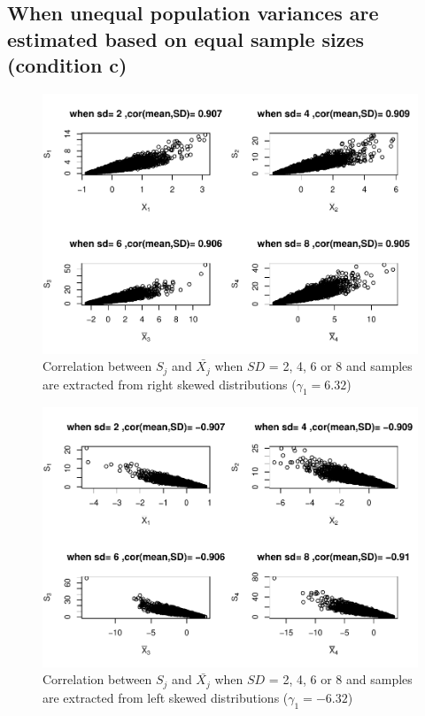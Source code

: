 \documentclass[
  english,
  man,mask]{apa6}
\begin{document}
\hypertarget{when-unequal-population-variances-are-estimated-based-on-equal-sample-sizes-condition-c}{%
\subsection{When unequal population variances are estimated based on equal sample sizes (condition c)}\label{when-unequal-population-variances-are-estimated-based-on-equal-sample-sizes-condition-c}}

\begin{figure}
\centering
\includegraphics{Correlation_files/figure-latex/Hetbalcorasafctofn1-1.pdf}
\caption{\label{fig:Hetbalcorasafctofn1}Correlation between \(S_j\) and \(\bar{X_j}\) when \(SD\) = 2, 4, 6 or 8 and samples are extracted from right skewed distributions (\(\gamma_1 = 6.32\))}
\end{figure}

\begin{figure}
\centering
\includegraphics{Correlation_files/figure-latex/Hetbalcorasafctofn2-1.pdf}
\caption{\label{fig:Hetbalcorasafctofn2}Correlation between \(S_j\) and \(\bar{X_j}\) when \(SD\) = 2, 4, 6 or 8 and samples are extracted from left skewed distributions (\(\gamma_1 = -6.32\))}
\end{figure}
\end{document}
